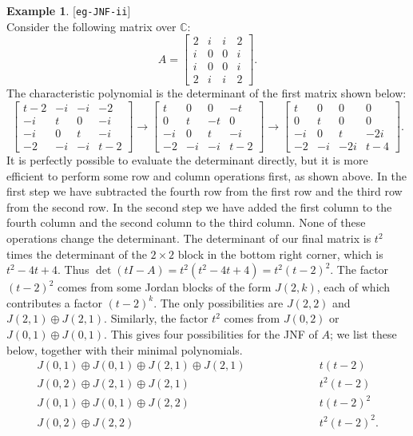 \documentclass{amsart}
\newcommand{\lbl}[1]{\label{#1}\textup{[\texttt{#1}]}\ \\}
\newcommand{\lbl}{\label}
\newcommand{\bbm}       {\left[\begin{matrix}}
\newcommand{\ebm}       {\end{matrix}\right]}
\newcommand{\C}         {{\mathbb{C}}}
\newcommand{\tm}        {\times}
\newcommand{\xra}       {\xrightarrow}
\newcommand{\op}        {\oplus}
\renewcommand{\:}{\colon}
\theoremstyle{definition}
\newtheorem{example}[theorem]{Example}
\begin{document}
\begin{example}\lbl{eg-JNF-ii}
 Consider the following matrix over $\C$:
 \[ A = \bbm 2 & i & i & 2 \\
             i & 0 & 0 & i \\
             i & 0 & 0 & i \\
             2 & i & i & 2 \ebm.
 \]
 The characteristic polynomial is the determinant of the first matrix
 shown below:
 \[ \bbm t-2 & -i & -i & -2 \\
          -i &  t &  0 & -i \\
          -i &  0 &  t & -i \\
          -2 & -i & -i & t-2 \ebm \xra{}
    \bbm   t &  0 &  0 & -t \\
           0 &  t & -t &  0 \\
          -i &  0 &  t & -i \\
          -2 & -i & -i & t-2 \ebm \xra{}
    \bbm   t &  0 &  0 &  0 \\
           0 &  t &  0 &  0 \\
          -i &  0 &  t & -2i\\
          -2 & -i & -2i& t-4 \ebm.
 \]
 It is perfectly possible to evaluate the determinant directly, but it
 is more efficient to perform some row and column operations first, as
 shown above.  In the first step we have subtracted the fourth row
 from the first row and the third row from the second row.  In the
 second step we have added the first column to the fourth column and
 the second column to the third column.  None of these operations
 change the determinant.  The determinant of our final matrix is $t^2$
 times the determinant of the $2\tm 2$ block in the bottom right
 corner, which is $t^2-4t+4$.  Thus
 $\det(tI-A)=t^2(t^2-4t+4)=t^2(t-2)^2$.  The factor $(t-2)^2$ comes
 from some Jordan blocks of the form $J(2,k)$, each of which
 contributes a factor $(t-2)^k$.  The only possibilities
 are $J(2,2)$ and $J(2,1)\op J(2,1)$.  Similarly, the factor $t^2$
 comes from $J(0,2)$ or $J(0,1)\op J(0,1)$.  This gives four
 possibilities for the JNF of $A$; we list these below,
 together with their minimal polynomials.  
 \[ \begin{array}{rcl}
   J(0,1)\op J(0,1)\op J(2,1)\op J(2,1) && t(t-2) \\
   J(0,2)\op J(2,1)\op J(2,1)           && t^2(t-2) \\
   J(0,1)\op J(0,1)\op J(2,2)           && t(t-2)^2 \\
   J(0,2)\op J(2,2) & \hspace{5em}       & t^2(t-2)^2.
  \end{array}
 \]


\end{example}
\end{document}
